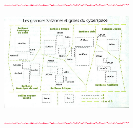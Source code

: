 \documentclass[11pt,twoside,a4paper]{article}
\def\barreCyberAgeHalf{\includegraphics[width=0.50\textwidth]{img/Filet_CA.png}}
\begin{document}
\begin{multicols*}{2}
\barreCyberAgeHalf %

\begin{center} \includegraphics[width=0.50\textwidth]{img/reglesMatriceSatZonesGrilles.jpg} \end{center}

\barreCyberAgeHalf %

\vfill
~\\
\columnbreak


\end{multicols*}
\end{document}
